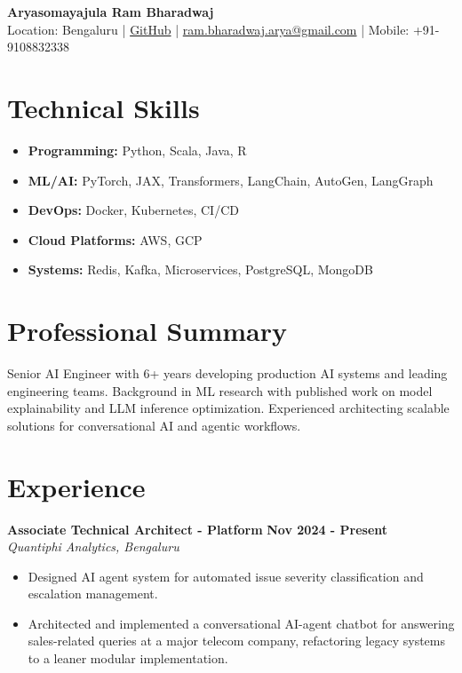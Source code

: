 \documentclass[11pt]{article}
\begin{document}
\begin{center}
\textbf{\Large Aryasomayajula Ram Bharadwaj} \\
\vspace{4pt}
Location: Bengaluru | \href{https://github.com/rokosbasilisk}{GitHub} | \href{mailto:ram.bharadwaj.arya@gmail.com}{ram.bharadwaj.arya@gmail.com} | Mobile: +91-9108832338
\end{center}

\vspace{12pt}

\section{Technical Skills}
\begin{itemize}[leftmargin=*, nosep]
\item \textbf{Programming:} Python, Scala, Java, R
\item \textbf{ML/AI:} PyTorch, JAX, Transformers, LangChain, AutoGen, LangGraph
\item \textbf{DevOps:} Docker, Kubernetes, CI/CD
\item \textbf{Cloud Platforms:} AWS, GCP
\item \textbf{Systems:} Redis, Kafka, Microservices, PostgreSQL, MongoDB
\end{itemize}

\section{Professional Summary}
Senior AI Engineer with 6+ years developing production AI systems and leading engineering teams. Background in ML research with published work on model explainability and LLM inference optimization. Experienced architecting scalable solutions for conversational AI and agentic workflows.

\section{Experience}

\textbf{Associate Technical Architect - Platform} \hfill \textbf{Nov 2024 - Present} \\
\textit{Quantiphi Analytics, Bengaluru}
\begin{itemize}[leftmargin=*, nosep]
\item Designed AI agent system for automated issue severity classification and escalation management.
\item Architected and implemented a conversational AI-agent chatbot for answering sales-related queries at a major telecom company, refactoring legacy systems to a leaner modular implementation.
\end{itemize}
\end{document}
